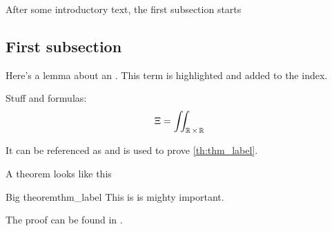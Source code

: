 After some introductory text, the first subsection starts

\subsection{First subsection}

Here's a lemma about an .
This term is highlighted and added to the index.

\begin{lemma} \label{lemma:small}
    Stuff and formulas:
    \begin{equation*}
        \Xi = \iint_{\operatorname{\mathbb{R}} \times \operatorname{\mathbb{R}}}
    \end{equation*}
\end{lemma}

It can be referenced as  and is used to prove \cref{th:thm_label}.

A theorem looks like this
\begin{thm}{Big theorem}{thm_label}
    This is is mighty important.
\end{thm}

\begin{pr}
    The proof can be found in \cite{HBGS2023}.
\end{pr}
